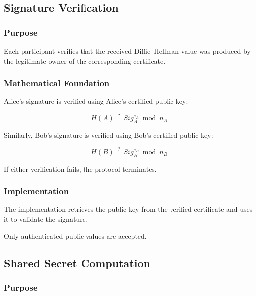 \documentclass[12pt]{article}
\begin{document}
\subsection{Signature Verification}

\subsubsection{Purpose}

Each participant verifies that the received Diffie--Hellman value was produced
by the legitimate owner of the corresponding certificate.

\subsubsection{Mathematical Foundation}

Alice's signature is verified using Alice's certified public key:

\begin{equation}
H(A)
\stackrel{?}{=}
Sig_A^{e_A}
\bmod n_A
\end{equation}

Similarly, Bob's signature is verified using Bob's certified public key:

\begin{equation}
H(B)
\stackrel{?}{=}
Sig_B^{e_B}
\bmod n_B
\end{equation}

If either verification fails, the protocol terminates.

\subsubsection{Implementation}

The implementation retrieves the public key from the verified certificate and
uses it to validate the signature.

Only authenticated public values are accepted.


\subsection{Shared Secret Computation}

\subsubsection{Purpose}
\end{document}
